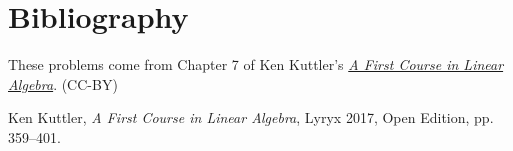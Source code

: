 \documentclass{ximera}
\begin{document}
\section*{Bibliography}
These problems come from Chapter 7 of Ken Kuttler's \href{https://open.umn.edu/opentextbooks/textbooks/a-first-course-in-linear-algebra-2017}{\it A First Course in Linear Algebra}. (CC-BY)

Ken Kuttler, {\it  A First Course in Linear Algebra}, Lyryx 2017, Open Edition, pp. 359--401. 
\end{document}
